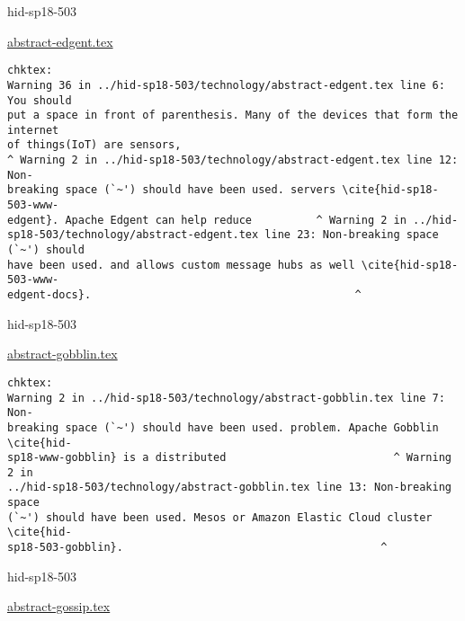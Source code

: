 

\begin{IU}

hid-sp18-503

\href{https://github.com/cloudmesh-community/hid-sp18-503/blob/master//technology/abstract-edgent.tex}{abstract-edgent.tex}

\begin{tiny}
\begin{verbatim}
chktex:
Warning 36 in ../hid-sp18-503/technology/abstract-edgent.tex line 6: You should
put a space in front of parenthesis. Many of the devices that form the internet
of things(IoT) are sensors,
^ Warning 2 in ../hid-sp18-503/technology/abstract-edgent.tex line 12: Non-
breaking space (`~') should have been used. servers \cite{hid-sp18-503-www-
edgent}. Apache Edgent can help reduce          ^ Warning 2 in ../hid-
sp18-503/technology/abstract-edgent.tex line 23: Non-breaking space (`~') should
have been used. and allows custom message hubs as well \cite{hid-sp18-503-www-
edgent-docs}.                                         ^
\end{verbatim}
\end{tiny}
\end{IU}



\begin{IU}

hid-sp18-503

\href{https://github.com/cloudmesh-community/hid-sp18-503/blob/master//technology/abstract-gobblin.tex}{abstract-gobblin.tex}

\begin{tiny}
\begin{verbatim}
chktex:
Warning 2 in ../hid-sp18-503/technology/abstract-gobblin.tex line 7: Non-
breaking space (`~') should have been used. problem. Apache Gobblin \cite{hid-
sp18-www-gobblin} is a distributed                          ^ Warning 2 in
../hid-sp18-503/technology/abstract-gobblin.tex line 13: Non-breaking space
(`~') should have been used. Mesos or Amazon Elastic Cloud cluster \cite{hid-
sp18-503-gobblin}.                                        ^
\end{verbatim}
\end{tiny}
\end{IU}



\begin{IU}

hid-sp18-503

\href{https://github.com/cloudmesh-community/hid-sp18-503/blob/master//technology/abstract-gossip.tex}{abstract-gossip.tex}

\begin{tiny}
\begin{verbatim}
\end{verbatim}
\end{tiny}
\end{IU}

